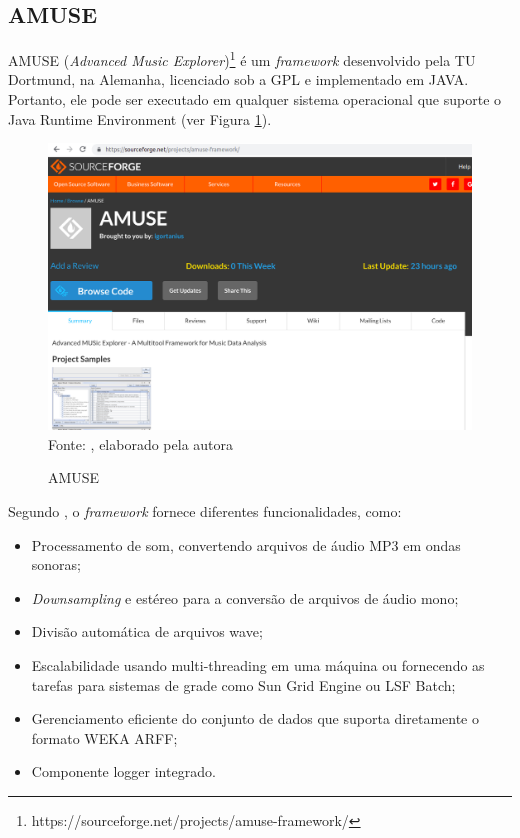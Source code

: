 \subsection{AMUSE} \label{subsec:amuse}
AMUSE (\textit{Advanced Music Explorer})\footnote{https://sourceforge.net/projects/amuse-framework/} é um \textit{framework} desenvolvido pela TU Dortmund, na Alemanha, licenciado sob a GPL e implementado em JAVA. Portanto, ele pode ser executado em qualquer sistema operacional que suporte o Java Runtime Environment (ver Figura \ref{fig:amuse}).

\begin{figure}[!htb]
   \centering
   \caption{AMUSE}\label{fig:amuse} 
   \includegraphics[scale=0.35]{figuras/amuse.png}
   \\Fonte: \cite{amuse}, elaborado pela autora
\end{figure}

Segundo , o \textit{framework} fornece diferentes funcionalidades, como:

\begin{itemize}
    \item Processamento de som, convertendo arquivos de áudio MP3 em ondas sonoras;
    \item \textit{Downsampling} e estéreo para a conversão de arquivos de áudio mono;
    \item Divisão automática de arquivos wave;
    \item Escalabilidade usando multi-threading em uma máquina ou fornecendo as tarefas para sistemas de grade como Sun Grid Engine ou LSF Batch;
    \item Gerenciamento eficiente do conjunto de dados que suporta diretamente o formato WEKA ARFF;
    \item Componente logger integrado.
\end{itemize}

